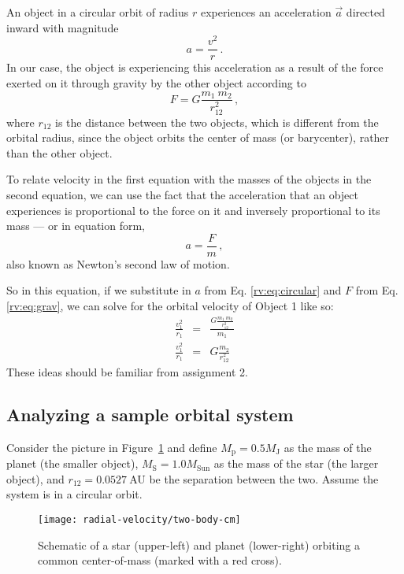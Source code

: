 An object in a circular orbit of radius $r$ experiences an acceleration $\vec{a}$ directed inward with magnitude
\begin{equation}\label{rv:eq:circular}
 a = \frac{v^2}{r} \,.
\end{equation}
In our case, the object is experiencing this acceleration as a result of the force exerted on it through gravity by the other object according to
\begin{equation}\label{rv:eq:grav}
 F = G \frac{m_1 \: m_2}{r_{12}^2} \,,
\end{equation}
where $r_{12}$ is the distance between the two objects, which is different from the orbital radius, since the object orbits the center of mass (or barycenter), rather than the other object.

To relate velocity in the first equation with the masses of the objects in the second equation, we can use the fact that the acceleration that an object experiences is proportional to the force on it and inversely proportional to its mass --- or in equation form,
\begin{equation}\label{rv:eq:n2l}
 a = \frac{F}{m} \,,
\end{equation}
also known as Newton's second law of motion.

So in this equation, if we substitute in $a$ from Eq. \ref{rv:eq:circular} and $F$ from Eq. \ref{rv:eq:grav}, we can solve for the orbital velocity of Object 1 like so:
\begin{eqnarray}
 \frac{v_1^2}{r_1} &=& \frac{G \frac{m_1 \: m_2}{r_{12}^2}}{m_1} \\
 \frac{v_1^2}{r_1} &=& G \frac{m_2}{r_{12}^2}
\end{eqnarray}
These ideas should be familiar from assignment 2. 

\subsection{Analyzing a sample orbital system}

Consider the picture in Figure~\ref{rv:fig:two-body-cm} and define $M_\textrm{p} = 0.5 M_\textrm{J}$ as the mass of the planet (the smaller object),  $M_\textrm{S} = 1.0 M_\textrm{Sun}$ as the mass of the star (the larger object), and $r_{12} = 0.0527\:$AU be the separation between the two. Assume the system is in a circular orbit.

\begin{figure}
	\centering
	\texttt{[image: radial-velocity/two-body-cm]}
	\caption{Schematic of a star (upper-left) and planet (lower-right) orbiting a common center-of-mass (marked with a red cross).}\label{rv:fig:two-body-cm}
\end{figure}

